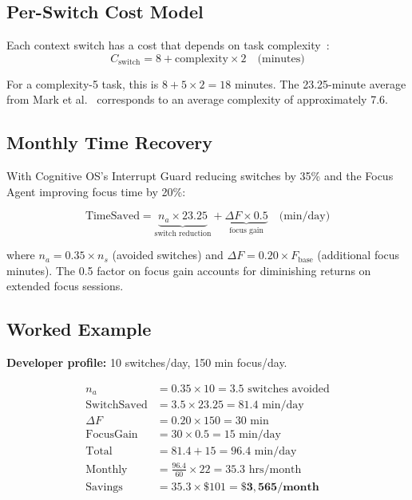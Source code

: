 \documentclass[11pt, twocolumn]{article}
\begin{document}
\subsection{Per-Switch Cost Model}

Each context switch has a cost that depends on task complexity~\cite{parnin2011resumption}:
\begin{equation}
C_{\text{switch}} = 8 + \text{complexity} \times 2 \quad \text{(minutes)}
\label{eq:switchcost_per}
\end{equation}

For a complexity-5 task, this is $8 + 5 \times 2 = 18$ minutes. The 23.25-minute average from Mark et al.~\cite{mark2008cost} corresponds to an average complexity of approximately 7.6.

\subsection{Monthly Time Recovery}

With Cognitive OS's Interrupt Guard reducing switches by 35\% and the Focus Agent improving focus time by 20\%:

\begin{equation}
\text{TimeSaved} = \underbrace{n_a \times 23.25}_{\text{switch reduction}} + \underbrace{\Delta F \times 0.5}_{\text{focus gain}} \quad \text{(min/day)}
\label{eq:timesaved}
\end{equation}

where $n_a = 0.35 \times n_s$ (avoided switches) and $\Delta F = 0.20 \times F_{\text{base}}$ (additional focus minutes). The 0.5 factor on focus gain accounts for diminishing returns on extended focus sessions.

\subsection{Worked Example}

\textbf{Developer profile:} 10 switches/day, 150 min focus/day.

\begin{align}
n_a &= 0.35 \times 10 = 3.5 \text{ switches avoided} \nonumber \\
\text{SwitchSaved} &= 3.5 \times 23.25 = 81.4 \text{ min/day} \nonumber \\
\Delta F &= 0.20 \times 150 = 30 \text{ min} \nonumber \\
\text{FocusGain} &= 30 \times 0.5 = 15 \text{ min/day} \nonumber \\
\text{Total} &= 81.4 + 15 = 96.4 \text{ min/day} \nonumber \\
\text{Monthly} &= \frac{96.4}{60} \times 22 = \mathbf{35.3} \text{ hrs/month} \nonumber \\
\text{Savings} &= 35.3 \times \$101 = \mathbf{\$3,565/\text{month}}
\label{eq:worked}
\end{align}
\end{document}
